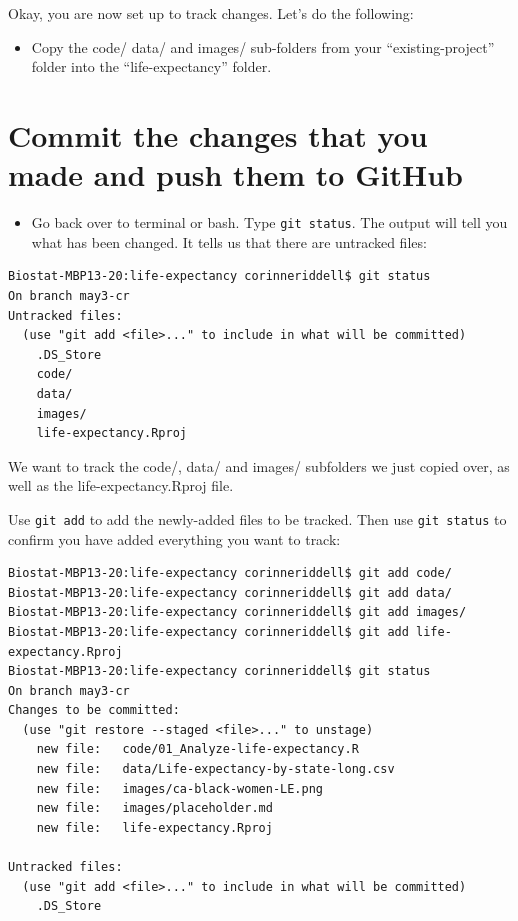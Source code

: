 \documentclass[
]{book}
\providecommand{\tightlist}{%
  \setlength{\itemsep}{0pt}\setlength{\parskip}{0pt}}
\begin{document}
Okay, you are now set up to track changes. Let's do the following:

\begin{itemize}
\tightlist
\item
  Copy the code/ data/ and images/ sub-folders from your ``existing-project'' folder into the
  ``life-expectancy'' folder.
\end{itemize}

\hypertarget{commit-the-changes-that-you-made-and-push-them-to-github}{%
\section{Commit the changes that you made and push them to GitHub}\label{commit-the-changes-that-you-made-and-push-them-to-github}}

\begin{itemize}
\tightlist
\item
  Go back over to terminal or bash. Type \texttt{git\ status}. The output will tell you
  what has been changed. It tells us that there are untracked files:
\end{itemize}

\begin{verbatim}
Biostat-MBP13-20:life-expectancy corinneriddell$ git status
On branch may3-cr
Untracked files:
  (use "git add <file>..." to include in what will be committed)
    .DS_Store
    code/
    data/
    images/
    life-expectancy.Rproj
\end{verbatim}

We want to track the code/, data/ and images/ subfolders we just copied over, as
well as the life-expectancy.Rproj file.

Use \texttt{git\ add} to add the newly-added files to be tracked. Then use \texttt{git\ status}
to confirm you have added everything you want to track:

\begin{verbatim}
Biostat-MBP13-20:life-expectancy corinneriddell$ git add code/
Biostat-MBP13-20:life-expectancy corinneriddell$ git add data/
Biostat-MBP13-20:life-expectancy corinneriddell$ git add images/
Biostat-MBP13-20:life-expectancy corinneriddell$ git add life-expectancy.Rproj 
Biostat-MBP13-20:life-expectancy corinneriddell$ git status
On branch may3-cr
Changes to be committed:
  (use "git restore --staged <file>..." to unstage)
    new file:   code/01_Analyze-life-expectancy.R
    new file:   data/Life-expectancy-by-state-long.csv
    new file:   images/ca-black-women-LE.png
    new file:   images/placeholder.md
    new file:   life-expectancy.Rproj

Untracked files:
  (use "git add <file>..." to include in what will be committed)
    .DS_Store
\end{verbatim}
\end{document}
